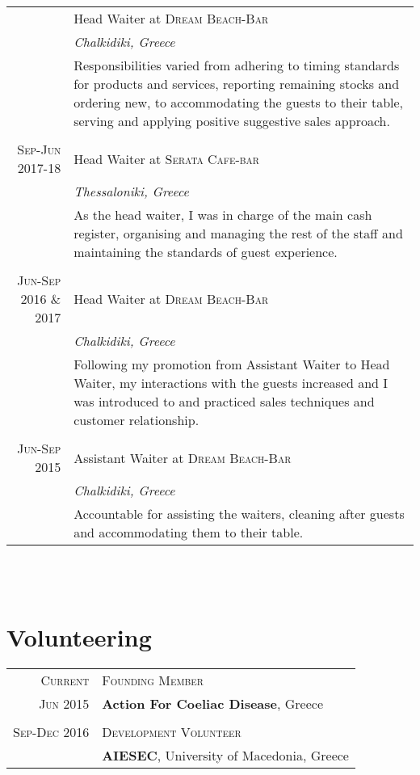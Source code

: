 \documentclass[a4paper,10pt]{article}
\begin{document}
\begin{tabular}{r|p{11cm}}
\begin{comment}
\textsc{Jun-Sep 2018} & Head Waiter at \textsc{Dream Beach-Bar} \\&\emph{Chalkidiki, Greece}\\&\footnotesize{Responsibilities varied from adhering to timing standards for products and services, reporting remaining stocks and ordering new, to accommodating the guests to their table, serving and applying positive suggestive sales approach.}\\\multicolumn{2}{c}{} \\
\textsc{Sep-Jun 2017-18} & Head Waiter at \textsc{Serata Cafe-bar} \\&\emph{Thessaloniki, Greece}\\&\footnotesize{As the head waiter, I was in charge of the main cash register, organising and managing the rest of the staff and maintaining the standards of guest experience.}\\\multicolumn{2}{c}{} \\
\textsc{Jun-Sep 2016 \& 2017} & Head Waiter at \textsc{Dream Beach-Bar} \\&\emph{Chalkidiki, Greece}\\&\footnotesize{Following my promotion from Assistant Waiter to Head Waiter, my interactions with the guests increased and I was introduced to and practiced sales techniques and customer relationship.}\\\multicolumn{2}{c}{} \\
\textsc{Jun-Sep 2015} & Assistant Waiter at \textsc{Dream Beach-Bar} \\&\emph{Chalkidiki, Greece}\\&\footnotesize{Accountable for assisting the waiters, cleaning after guests and accommodating them to their table.}
\end{comment}

\end{tabular} \\ \\

\section{Volunteering}
\begin{tabular}{rl}
    \textsc{Current} & \textsc{Founding Member} \\ \textsc{Jun 2015} & \textbf{Action For Coeliac Disease}, Greece \\ \\ 
    \textsc{Sep-Dec 2016} & \textsc{Development Volunteer} \\& \textbf{AIESEC}, University of Macedonia, Greece\\
\end{tabular} \\ \\
\end{document}

